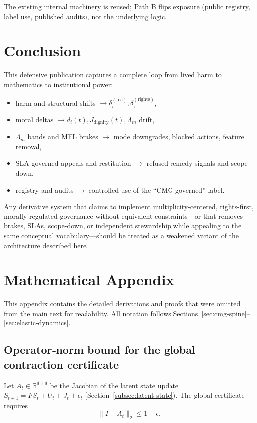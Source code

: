 \documentclass[11pt]{article}
\begin{document}
The existing internal machinery is reused; Path B flips exposure (public registry, label use, published audits), not the underlying logic.

\section{Conclusion}

This defensive publication captures a complete loop from lived harm to mathematics to institutional power:

\begin{itemize}[leftmargin=*]
  \item harm and structural shifts \(\rightarrow \delta_i^{(\text{rec})}, \delta_i^{(\text{rights})}\),
  \item moral deltas \(\rightarrow d_i(t), J_{\text{dignity}}(t), \Lambda_m\) drift,
  \item \(\Lambda_m\) bands and MFL brakes \(\rightarrow\) mode downgrades, blocked actions, feature removal,
  \item SLA-governed appeals and restitution \(\rightarrow\) refused-remedy signals and scope-down,
  \item registry and audits \(\rightarrow\) controlled use of the ``CMG-governed'' label.
\end{itemize}

Any derivative system that claims to implement multiplicity-centered, rights-first, morally regulated governance without equivalent constraints---or that removes brakes, SLAs, scope-down, or independent stewardship while appealing to the same conceptual vocabulary---should be treated as a weakened variant of the architecture described here.

\appendix
\section{Mathematical Appendix}
\label{app:math}

This appendix contains the detailed derivations and proofs that were omitted from the main text for readability. All notation follows Sections~\ref{sec:cmg-spine}--\ref{sec:elastic-dynamics}.

\subsection{Operator‑norm bound for the global contraction certificate}
Let $A_t\in\mathbb{R}^{d\times d}$ be the Jacobian of the latent state update $S_{t+1}=F S_t+U_t+J_t+\epsilon_t$ (Section~\ref{subsec:latent-state}). The global certificate requires  
\[
\|I-A_t\|_2 \le 1-\epsilon .
\tag{A1}
\]
\end{document}
